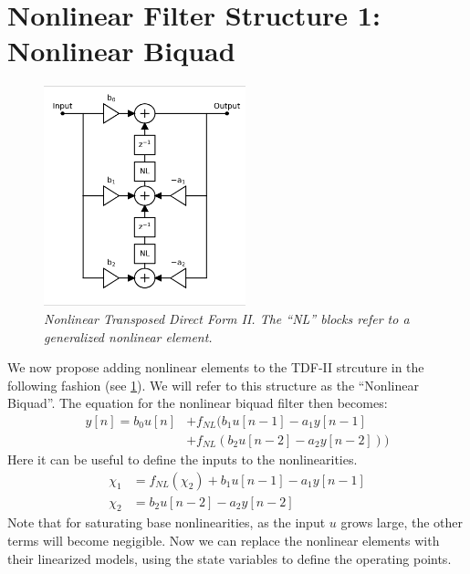 \documentclass[twoside,a4paper]{article}
\begin{document}
\section{Nonlinear Filter Structure 1: Nonlinear Biquad}
%
\begin{figure}[ht]
    \center
    \includegraphics[width=2.3in]{../Pics/NL-TDF-II-White.png}
    \caption{\label{NL-TDF-II}{\it Nonlinear Transposed Direct Form II.
                                The ``NL'' blocks refer to a generalized
                                nonlinear element.}}
\end{figure}
%
We now propose adding nonlinear elements to the TDF-II strcuture in the
following fashion (see \cref{NL-TDF-II}). We will refer to this structure
as the ``Nonlinear Biquad''.
%
The equation for the nonlinear biquad filter then becomes:
%
\begin{equation}
\begin{split}
    y[n] = b_0 u[n]
         &+ f_{NL} (b_1 u[n-1] - a_1 y[n-1] \\
         &+ f_{NL} (b_2 u[n-2] - a_2 y[n-2]))
\end{split}
    \label{eq:bq_NL}
\end{equation}
%
Here it can be useful to define the inputs to the
nonlinearities.
%
\begin{equation}
\begin{split}
    \chi_1 &= f_{NL} (\chi_2) + b_1 u[n-1] - a_1 y[n-1] \\
    \chi_2 &= b_2 u[n-2] - a_2 y[n-2]
\end{split}
    \label{eq:states}
\end{equation}
%
Note that for saturating base nonlinearities, as the input $u$ grows large,
the other terms will become negigible.
\newline\newline
Now we can replace the nonlinear elements with their linearized
models, using the state variables to define the operating points.
\end{document}
